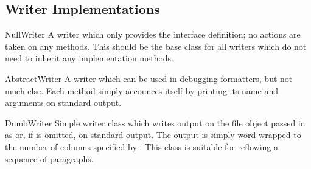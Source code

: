 \subsection{Writer Implementations}

\begin{funcdesc}{NullWriter}{}
A writer which only provides the interface definition; no actions are
taken on any methods.  This should be the base class for all writers
which do not need to inherit any implementation methods.
\end{funcdesc}

\begin{funcdesc}{AbstractWriter}{}
A writer which can be used in debugging formatters, but not much
else.  Each method simply accounces itself by printing its name and
arguments on standard output.
\end{funcdesc}

\begin{funcdesc}{DumbWriter}{}
Simple writer class which writes output on the file object passed in
as  or, if  is omitted, on standard output.  The
output is simply word-wrapped to the number of columns specified by
.  This class is suitable for reflowing a sequence of
paragraphs.
\end{funcdesc}
